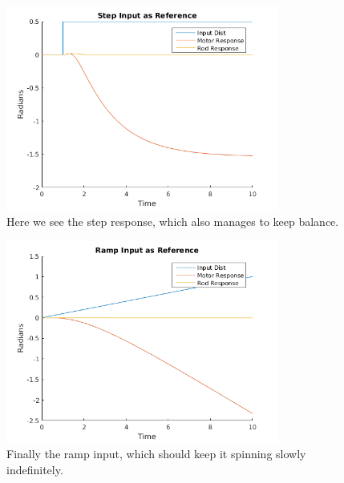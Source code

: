 \documentclass[12pt]{extarticle}
\newenvironment{sect}
  {\adjustwidth{-2.25em}{0pt}}
  {\endadjustwidth}
\begin{document}
\begin{sect}
\begin{figure}[H]
    \centering
    \includegraphics[width=0.8\textwidth]{Images/Step_in.png}
    \caption{Here we see the step response, which also manages to keep balance.}
\end{figure}
\begin{figure}[H]
    \centering
    \includegraphics[width=0.8\textwidth]{Images/ramp_in.png}
    \caption{Finally the ramp input, which should keep it spinning slowly indefinitely.}
\end{figure}


\end{sect}
\end{document}
